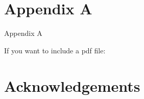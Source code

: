 \documentclass{Configuration_Files/PoliMi3i_thesis}
\begin{document}
\cleardoublepage
{} %
\chapter*{Appendix A}
\label{chapter:Appendix A}
Appendix A

If you want to include a pdf file:
%


\chapter*{Acknowledgements}


\cleardoublepage

%
\end{document}
